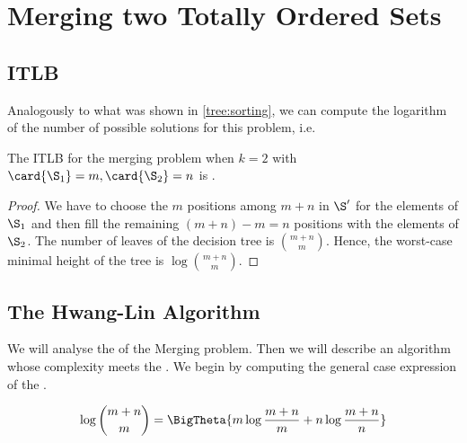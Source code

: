 \section{Merging two Totally Ordered Sets}
\label{tree:merging:k=2}

\subsection*{ITLB}
\label{tree:merging:k=2:ITLB}

Analogously to what was shown in \ref{tree:sorting}, we can compute the
logarithm of the number of possible solutions for this problem, i.e.

\begin{theorem}
The ITLB for the merging problem when \(k = 2\) with \(\card{\S_1} = m, \card{\S_2}
= n\) is .
\end{theorem}

\begin{proof}
We have to choose the $m$ positions among $m+n$ in $\S'$ for the elements of
$\S_1$ and then fill the remaining $(m+n) - m = n$ positions with the elements
of $\S_2$. The number of leaves of the decision tree is $\binom{m+n}{m}$.
Hence, the worst-case minimal height of the tree is $\log \binom{m+n}{m}$.
\end{proof}



\subsection*{The Hwang-Lin Algorithm}
\label{tree:merging:k=2:alg}

We will analyse the  of the Merging problem. Then we will
describe an algorithm whose complexity meets the . We begin by
computing the general case expression of the .

\begin{lemma}
\begin{align*}
\log\binom{m+n}{m} &= \BigTheta{m \log\frac{m+n}{m} + n \log\frac{m+n}{n}}\\
\end{align*}
\end{lemma}

